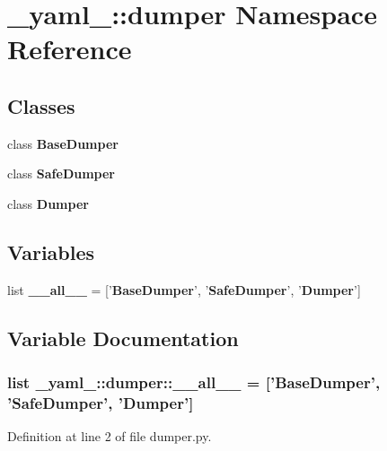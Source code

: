 \section{\_\-yaml\_\-::dumper Namespace Reference}
\label{namespace__yaml___1_1dumper}


\subsection*{Classes}
\begin{CompactItemize}
\item 
class {\bf BaseDumper}
\item 
class {\bf SafeDumper}
\item 
class {\bf Dumper}
\end{CompactItemize}
\subsection*{Variables}
\begin{CompactItemize}
\item 
list {\bf \_\-\_\-all\_\-\_\-} = ['{\bf BaseDumper}', '{\bf SafeDumper}', '{\bf Dumper}']
\end{CompactItemize}


\subsection{Variable Documentation}
\subsubsection{\setlength{\rightskip}{0pt plus 5cm}list {\bf \_\-yaml\_\-::dumper::\_\-\_\-all\_\-\_\-} = ['{\bf BaseDumper}', '{\bf SafeDumper}', '{\bf Dumper}']\hspace{0.3cm}{\tt  [static]}}\label{namespace__yaml___1_1dumper_0d8f15dc7546e31fc966627aec4b3ac4}




Definition at line 2 of file dumper.py.